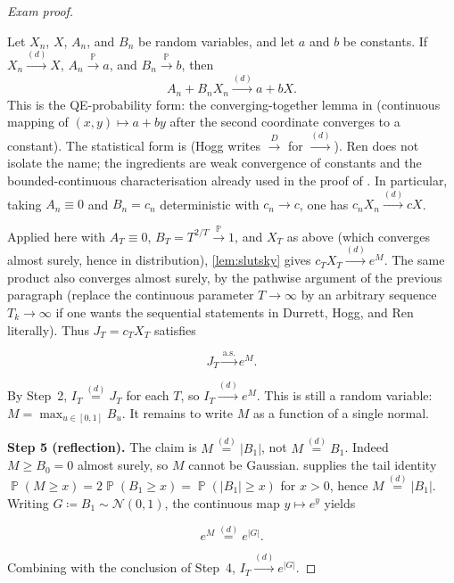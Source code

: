 \documentclass[11pt,a4paper]{article}
\DeclareMathOperator{\Pbb}{\mathbb{P}}
\begin{document}
\begin{proof}[Exam proof]
\begin{lemma}[Slutsky]
\label{lem:slutsky}
Let \(X_n\), \(X\), \(A_n\), and \(B_n\) be random variables, and let \(a\) and \(b\) be constants. If \(X_n\xrightarrow{(d)}X\), \(A_n\xrightarrow{\Pbb}a\), and \(B_n\xrightarrow{\Pbb}b\), then
\[
A_n+B_n X_n
\xrightarrow{(d)}
a+bX.
\]
This is the QE-probability form: the converging-together lemma in \citep[\S3.2]{durrett2010} (continuous mapping of \((x,y)\mapsto a+by\) after the second coordinate converges to a constant). The statistical form is \citep[Theorem~5.2.5]{hogg2019} (Hogg writes \(\stackrel{D}{\to}\) for \(\xrightarrow{(d)}\)). Ren does not isolate the name; the ingredients are weak convergence of constants \citep[Proposition~9.2.2]{ren2024} and the bounded-continuous characterisation already used in the proof of \citep[Proposition~9.2.1]{ren2024}. In particular, taking \(A_n\equiv 0\) and \(B_n=c_n\) deterministic with \(c_n\to c\), one has \(c_n X_n\xrightarrow{(d)}cX\).
\end{lemma}

Applied here with \(A_T\equiv 0\), \(B_T=T^{2/T}\xrightarrow{\Pbb}1\), and \(X_T\) as above (which converges almost surely, hence in distribution), \cref{lem:slutsky} gives \(c_T X_T\xrightarrow{(d)}e^{M}\). The same product also converges almost surely, by the pathwise argument of the previous paragraph (replace the continuous parameter \(T\to\infty\) by an arbitrary sequence \(T_k\to\infty\) if one wants the sequential statements in Durrett, Hogg, and Ren literally). Thus \(J_T=c_T X_T\) satisfies

\[
J_T
\xrightarrow{\mathrm{a.s.}}
e^{M}.
\]

By Step~2, \(I_T\stackrel{(d)}{=}J_T\) for each \(T\), so \(I_T\xrightarrow{(d)}e^{M}\). This is still a random variable: \(M=\max_{u\in[0,1]}B_u\). It remains to write \(M\) as a function of a single normal.

\textbf{Step 5 (reflection).}
The claim is \(M\stackrel{(d)}{=}|B_1|\), not \(M\stackrel{(d)}{=}B_1\). Indeed \(M\ge B_0=0\) almost surely, so \(M\) cannot be Gaussian.  supplies the tail identity \(\Pbb(M\ge x)=2\Pbb(B_1\ge x)=\Pbb(|B_1|\ge x)\) for \(x>0\), hence \(M\stackrel{(d)}{=}|B_1|\). Writing \(G\coloneqq B_1\sim\mathcal{N}(0,1)\), the continuous map \(y\mapsto e^{y}\) yields

\[
e^{M}
\stackrel{(d)}{=}
e^{|G|}.
\]

Combining with the conclusion of Step~4, \(I_T\xrightarrow{(d)}e^{|G|}\).
\end{proof}
\end{document}
